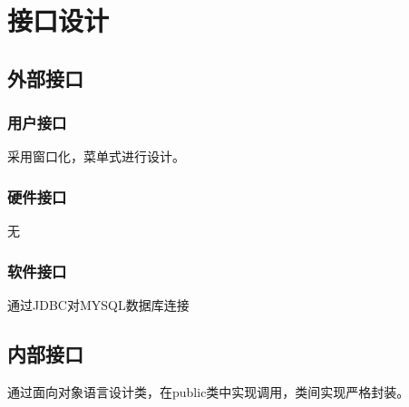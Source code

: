 \chapter{接口设计}
\section{外部接口}
\subsection{用户接口}
采用窗口化，菜单式进行设计。

\subsection{硬件接口}
无

\subsection{软件接口}
通过JDBC对MYSQL数据库连接

\section{内部接口}
通过面向对象语言设计类，在public类中实现调用，类间实现严格封装。